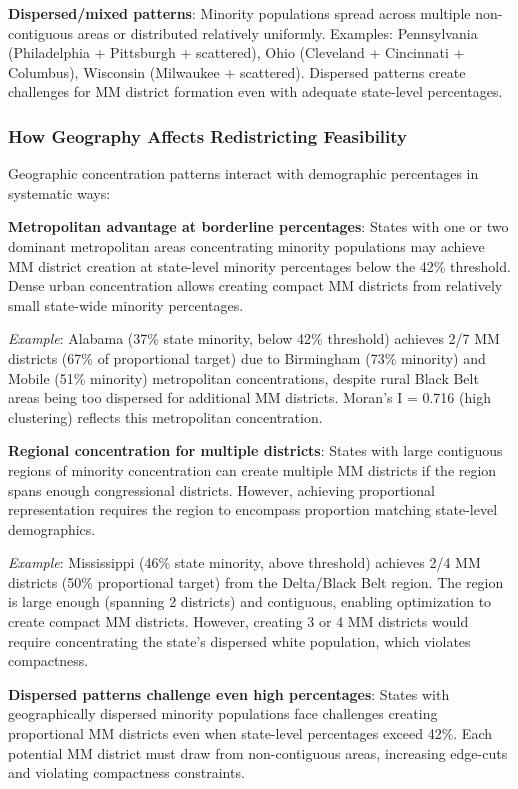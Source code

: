 \textbf{Dispersed/mixed patterns}: Minority populations spread across multiple non-contiguous areas or distributed relatively uniformly. Examples: Pennsylvania (Philadelphia + Pittsburgh + scattered), Ohio (Cleveland + Cincinnati + Columbus), Wisconsin (Milwaukee + scattered). Dispersed patterns create challenges for MM district formation even with adequate state-level percentages.

\subsubsection{How Geography Affects Redistricting Feasibility}

Geographic concentration patterns interact with demographic percentages in systematic ways:

\textbf{Metropolitan advantage at borderline percentages}: States with one or two dominant metropolitan areas concentrating minority populations may achieve MM district creation at state-level minority percentages below the 42\% threshold. Dense urban concentration allows creating compact MM districts from relatively small state-wide minority percentages.

\textit{Example}: Alabama (37\% state minority, below 42\% threshold) achieves 2/7 MM districts (67\% of proportional target) due to Birmingham (73\% minority) and Mobile (51\% minority) metropolitan concentrations, despite rural Black Belt areas being too dispersed for additional MM districts. Moran's I = 0.716 (high clustering) reflects this metropolitan concentration.

\textbf{Regional concentration for multiple districts}: States with large contiguous regions of minority concentration can create multiple MM districts if the region spans enough congressional districts. However, achieving proportional representation requires the region to encompass proportion matching state-level demographics.

\textit{Example}: Mississippi (46\% state minority, above threshold) achieves 2/4 MM districts (50\% proportional target) from the Delta/Black Belt region. The region is large enough (spanning 2 districts) and contiguous, enabling optimization to create compact MM districts. However, creating 3 or 4 MM districts would require concentrating the state's dispersed white population, which violates compactness.

\textbf{Dispersed patterns challenge even high percentages}: States with geographically dispersed minority populations face challenges creating proportional MM districts even when state-level percentages exceed 42\%. Each potential MM district must draw from non-contiguous areas, increasing edge-cuts and violating compactness constraints.


